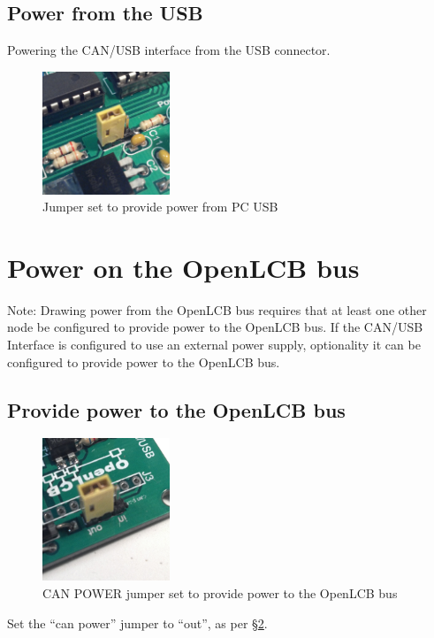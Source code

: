 \documentclass[11pt]{book}
\begin{document}
\subsection{Power from the USB}
Powering the CAN/USB interface from the USB connector.
\begin{figure}[htbp]
\begin{center}
\includegraphics[width=1.5in]{images/power_line_usb.png}
\caption{Jumper set to provide power from PC USB}
\label{CANOUT}
\end{center}
\end{figure}
\section{Power on the OpenLCB bus}
Note: Drawing power from the OpenLCB bus requires that at least one other node be configured to provide power to the OpenLCB bus.
If the CAN/USB Interface is configured to use an external power supply, optionality it can be configured to provide power to the OpenLCB bus.
\subsection{Provide power to the OpenLCB bus}
\begin{figure}[htbp]
\begin{center}
\includegraphics[width=1.5in]{images/power_out.png}
\caption{CAN POWER jumper set to provide power to the OpenLCB bus}
\label{CANOUT}
\end{center}
\end{figure}
Set the ``can power'' jumper to ``out'', as per \S\ref{CANOUT}.
\end{document}
